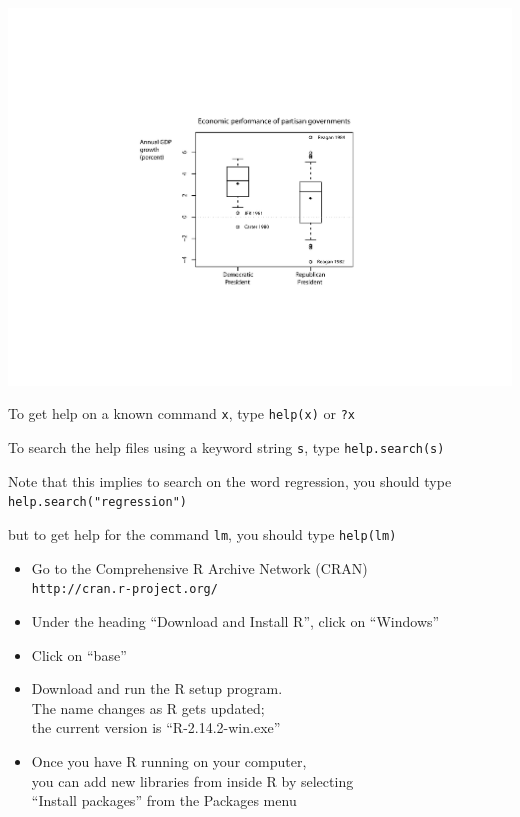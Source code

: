 \documentclass[pdflatex,landscape,titlepage]{foils}
\begin{document}
\begin{center}

\includegraphics[width=9 in]{gdpbox3}

\end{center}



\bgclear

To get help on a known command \texttt{x}, type \texttt{help(x)} or \texttt{?x}

To search the help files using a keyword string \texttt{s}, type \texttt{help.search(s)} 

Note that this implies to search on the word regression, you should type\\
\texttt{help.search("regression")} 

but to get help for the command \texttt{lm}, you should type
\texttt{help(lm)} 


\bgclear

\begin{itemize}
\item Go to the Comprehensive R Archive Network (CRAN) \\
      \texttt{http://cran.r-project.org/}

\item Under the heading ``Download and Install R'', click on ``Windows''

\item Click on ``base''

\item Download and run the R setup program.  \\
The name changes as R gets updated; \\
the current version is ``R-2.14.2-win.exe''

\item Once you have R running on your computer, \\
you can add new libraries from inside R by selecting \\
``Install packages'' from the Packages menu
\end{itemize}
\end{document}
